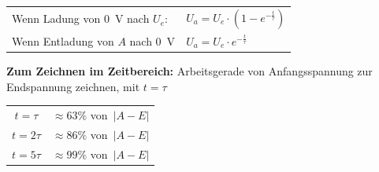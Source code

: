 \documentclass[a5paper, 12pt, twoside]{scrartcl}
\begin{document}
\begin{center}
  \begin{tabular}{ll}
    \toprule
    Wenn Ladung von \SI{0}{\volt} nach \(U_e\): & \(U_a = U_e \cdot (1 - e^{-\frac{t}{\tau}})\)\\
    Wenn Entladung von \(A\) nach \SI{0}{\volt} & \(U_a = U_e \cdot e^{-\frac{t}{\tau}}\)\\
    \bottomrule
  \end{tabular}
\end{center}

\textbf{Zum Zeichnen im Zeitbereich:} Arbeitsgerade von Anfangsspannung zur Endspannung zeichnen, mit \(t = \tau\)



\begin{table}[H]
  \centering
  \begin{tabular}{cc}
    \toprule
    \(t=\tau\) & \(\approx 63\%\) von\ \(|A-E|\)\\
    \(t=2\tau\) & \(\approx 86\%\) von\ \(|A-E|\)\\
    \(t=5\tau\) & \(\approx 99\%\) von\ \(|A-E|\)\\
    \bottomrule
  \end{tabular}
\end{table}
 
\end{document}
